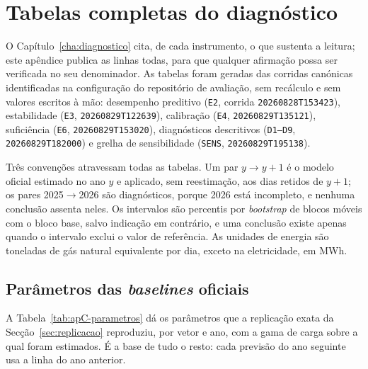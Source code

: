 
\chapter{Tabelas completas do diagnóstico}
\label{app:tabelas}

O Capítulo~\ref{cha:diagnostico} cita, de cada instrumento, o que sustenta a
leitura; este apêndice publica as linhas todas, para que qualquer afirmação
possa ser verificada no seu denominador. As tabelas foram geradas das corridas
canónicas identificadas na configuração do repositório de avaliação, sem
recálculo e sem valores escritos à mão: desempenho preditivo
(\texttt{E2}, corrida \texttt{20260828T153423}), estabilidade (\texttt{E3},
\texttt{20260829T122639}), calibração (\texttt{E4}, \texttt{20260829T135121}),
suficiência (\texttt{E6}, \texttt{20260829T153020}), diagnósticos descritivos
(\texttt{D1--D9}, \texttt{20260829T182000}) e grelha de sensibilidade
(\texttt{SENS}, \texttt{20260829T195138}).

Três convenções atravessam todas as tabelas. Um par $y\to y{+}1$ é o modelo
oficial estimado no ano $y$ e aplicado, sem reestimação, aos dias retidos de
$y{+}1$; os pares 2025$\to$2026 são diagnósticos, porque 2026 está incompleto,
e nenhuma conclusão assenta neles. Os intervalos são percentis por
\emph{bootstrap} de blocos móveis com o bloco base, salvo indicação em
contrário, e uma conclusão existe apenas quando o intervalo exclui o valor de
referência. As unidades de energia são toneladas de gás natural equivalente por
dia, exceto na eletricidade, em MWh.

\section{Parâmetros das \emph{baselines} oficiais}
\label{sec:apC-parametros}

A Tabela~\ref{tab:apC-parametros} dá os parâmetros que a replicação exata da
Secção~\ref{sec:replicacao} reproduziu, por vetor e ano, com a gama de carga
sobre a qual foram estimados. É a base de tudo o resto: cada previsão do ano
seguinte usa a linha do ano anterior.

